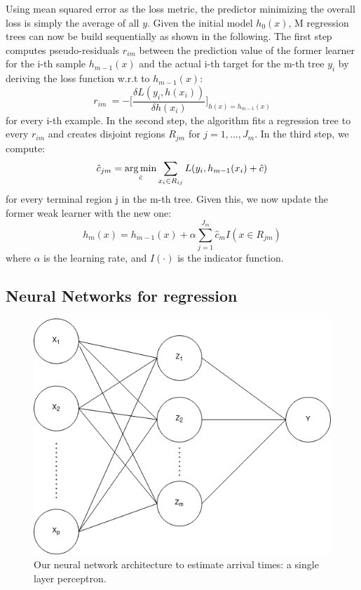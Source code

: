 Using mean squared error as the loss metric, the predictor minimizing the overall loss is simply the average of all $ y $.
Given the initial model $ h_0(x) $, M regression trees can now be build sequentially as shown in the following. 
The first step computes pseudo-residuals $ r_{im} $ between the prediction value of the former learner for the i-th sample $ h_{m-1}(x) $ and the actual i-th target for the m-th tree $ y_i $ by deriving the loss function w.r.t to $ h_{m-1}(x) $: 
\begin{equation}
	r_{im}\ = - \bigg[\dfrac{\delta L(y_i, h(x_i))}{\delta h(x_i)}\bigg]_{h(x) = h_{m-1}(x)}
\end{equation} 
for every i-th example.
In the second step, the algorithm fits a regression tree to every $ r_{im} $ and creates disjoint regions $ R_{jm} $ for $j = 1, ..., J_m$. 
In the third step, we compute: 
\begin{equation}
	\hat{c}_{jm} = \operatorname*{arg\,min}_{\hat{c}} \sum_{x_i \in R_{ij}} L(y_i, h_{m-1}(x_i) + \hat{c})
\end{equation}
for every terminal region j in the m-th tree. 
Given this, we now update the former weak learner with the new one:
\begin{equation}
	h_m(x) = h_{m-1}(x) + \alpha \sum_{j=1}^{J_m} \hat{c}_{m}I(x \in R_{jm})
\end{equation}
where $ \alpha $ is the learning rate, and $ I(\cdot) $ is the indicator function. 


\subsection{Neural Networks for regression}


\begin{figure}[h]
	\centering
	\includegraphics[width=0.5\linewidth]{../simplenn.png}
	\caption{Our neural network architecture to estimate arrival times: a single layer perceptron.}
	\label{fig:nnarchitecture}
\end{figure}


